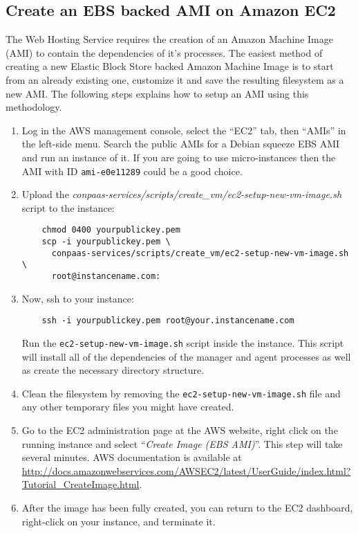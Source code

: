\documentclass[10pt]{article}
\begin{document}
\subsection{Create an EBS backed AMI on Amazon EC2}

The Web Hosting Service requires the creation of an Amazon Machine
Image (AMI) to contain the dependencies of it's processes.  The
easiest method of creating a new Elastic Block Store backed Amazon
Machine Image is to start from an already existing one, customize it
and save the resulting filesystem as a new AMI. The following steps
explains how to setup an AMI using this methodology.

\begin{enumerate}
\item Log in the AWS management console, select the ``EC2'' tab, then
  ``AMIs'' in the left-side menu. Search the public AMIs for a Debian
  squeeze EBS AMI and run an instance of it. If you are going to use
  micro-instances then the AMI with ID \verb+ami-e0e11289+ could be a
  good choice.

\item Upload the \textit{conpaas-services/scripts/create\_vm/ec2-setup-new-vm-image.sh} script to the instance:
  \begin{verbatim}
    chmod 0400 yourpublickey.pem
    scp -i yourpublickey.pem \
      conpaas-services/scripts/create_vm/ec2-setup-new-vm-image.sh \
      root@instancename.com:
  \end{verbatim}

\item Now, ssh to your instance:
  \begin{verbatim}
    ssh -i yourpublickey.pem root@your.instancename.com
  \end{verbatim}
  Run the \verb+ec2-setup-new-vm-image.sh+ script inside the instance.
  This script will install all of the dependencies of the manager and
  agent processes as well as create the necessary directory structure.

\item Clean the filesystem by removing the
  \verb+ec2-setup-new-vm-image.sh+ file and any other temporary files you might
  have created.

\item Go to the EC2 administration page at the AWS website, right
  click on the running instance and select ``\emph{Create Image (EBS
    AMI)}''.  This step will take several minutes. AWS documentation
  is available at
  \url{http://docs.amazonwebservices.com/AWSEC2/latest/UserGuide/index.html?Tutorial\_CreateImage.html}.

\item After the image has been fully created, you can return to the
  EC2 dashboard, right-click on your instance, and terminate it.
\end{enumerate}
\end{document}
